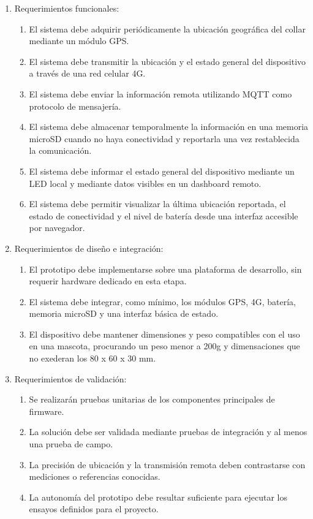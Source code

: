 \documentclass[
11pt, %
]{charter}
\begin{document}
\begin{enumerate}
	\item Requerimientos funcionales:
	\begin{enumerate}
		\item El sistema debe adquirir periódicamente la ubicación geográfica del collar mediante un módulo GPS.
		\item El sistema debe transmitir la ubicación y el estado general del dispositivo a través de una red celular 4G.
		\item El sistema debe enviar la información remota utilizando MQTT como protocolo de mensajería.
		\item El sistema debe almacenar temporalmente la información en una memoria microSD cuando no haya conectividad y reportarla una vez restablecida la comunicación.
		\item El sistema debe informar el estado general del dispositivo mediante un LED local y mediante datos visibles en un dashboard remoto.
		\item El sistema debe permitir visualizar la última ubicación reportada, el estado de conectividad y el nivel de batería desde una interfaz accesible por navegador.
	\end{enumerate}
	
	\item Requerimientos de diseño e integración:
	\begin{enumerate}
		\item El prototipo debe implementarse sobre una plataforma de desarrollo, sin requerir hardware dedicado en esta etapa.
		\item El sistema debe integrar, como mínimo, los módulos GPS, 4G, batería, memoria microSD y una interfaz básica de estado.
		\item El dispositivo debe mantener dimensiones y peso compatibles con el uso en una mascota, procurando un peso menor a 200g y dimensaciones que no exederan los 80 x 60 x 30 mm.
	\end{enumerate}
	
	\item Requerimientos de validación:
	\begin{enumerate}
		\item Se realizarán pruebas unitarias de los componentes principales de firmware.
		\item La solución debe ser validada mediante pruebas de integración y al menos una prueba de campo.
		\item La precisión de ubicación y la transmisión remota deben contrastarse con mediciones o referencias conocidas.
		\item La autonomía del prototipo debe resultar suficiente para ejecutar los ensayos definidos para el proyecto.
	\end{enumerate}
	

\end{enumerate}
\end{document}
